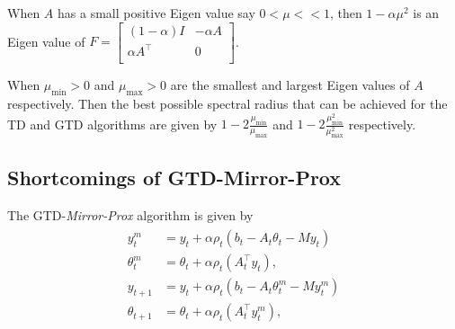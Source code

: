\begin{lemma}\label{squared}
When $A$ has a small positive Eigen value say $0<\mu<<1$, then $1-\alpha\mu^2$ is an Eigen value of $F=\begin{bmatrix} (1-\alpha)I & -\alpha A \\ \alpha A^\top& 0\\\end{bmatrix}$.
\end{lemma}
\begin{lemma}
When $\mu_{\min}>0$ and $\mu_{\max}>0$ are the smallest and largest Eigen values of $A$ respectively. Then the best possible spectral radius that can be achieved for the TD and GTD algorithms are given by $1-2\frac{\mu_{\min}}{\mu_{\max}}$ and $1-2\frac{\mu_{\min}^2}{\mu_{\max}^2}$ respectively.
\end{lemma}
\subsection{Shortcomings of GTD-Mirror-Prox}
The GTD-\emph{Mirror-Prox} algorithm is given by
\begin{align}
\begin{split}
y^m_{t}&=y_t+\alpha \rho_t(b_t-A_t\theta_t - M y_t)\\
\theta^m_{t}&=\theta_t+\alpha\rho_t(A^\top_ty_t),\\
y_{t+1}&=y_t+\alpha \rho_t(b_t-A_t\theta^m_t - M y^m_t)\\
\theta_{t+1}&=\theta_t+\alpha\rho_t(A^\top_ty^m_t),
\end{split}
\end{align}
\begin{table}
\end{table}
